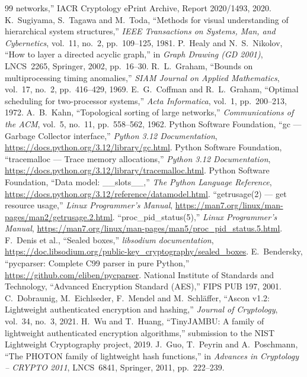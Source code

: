 \documentclass[12pt,a4paper,oneside]{report}
\begin{document}
\begin{thebibliography}{99}
  networks,'' IACR Cryptology ePrint Archive, Report 2020/1493, 2020.
 K.~Sugiyama, S.~Tagawa and M.~Toda, ``Methods for visual understanding of
  hierarchical system structures,'' \emph{IEEE Transactions on Systems, Man, and Cybernetics},
  vol.~11, no.~2, pp.~109--125, 1981.
 P.~Healy and N.~S.~Nikolov, ``How to layer a directed acyclic graph,'' in
  \emph{Graph Drawing (GD 2001)}, LNCS~2265, Springer, 2002, pp.~16--30.
 R.~L.~Graham, ``Bounds on multiprocessing timing anomalies,'' \emph{SIAM
  Journal on Applied Mathematics}, vol.~17, no.~2, pp.~416--429, 1969.
 E.~G.~Coffman and R.~L.~Graham, ``Optimal scheduling for two-processor
  systems,'' \emph{Acta Informatica}, vol.~1, pp.~200--213, 1972.
 A.~B.~Kahn, ``Topological sorting of large networks,'' \emph{Communications of the
  ACM}, vol.~5, no.~11, pp.~558--562, 1962.
 Python Software Foundation, ``gc --- Garbage Collector interface,'' \emph{Python
  3.12 Documentation}, \url{https://docs.python.org/3.12/library/gc.html}.
 Python Software Foundation, ``tracemalloc --- Trace memory allocations,''
  \emph{Python 3.12 Documentation}, \url{https://docs.python.org/3.12/library/tracemalloc.html}.
 Python Software Foundation, ``Data model: \_\_slots\_\_,'' \emph{The Python
  Language Reference}, \url{https://docs.python.org/3.12/reference/datamodel.html}.
 ``getrusage(2) --- get resource usage,'' \emph{Linux Programmer's Manual},
  \url{https://man7.org/linux/man-pages/man2/getrusage.2.html}.
 ``proc\_pid\_status(5),'' \emph{Linux Programmer's Manual},
  \url{https://man7.org/linux/man-pages/man5/proc_pid_status.5.html}.
 F.~Denis et al., ``Sealed boxes,'' \emph{libsodium documentation},
  \url{https://doc.libsodium.org/public-key_cryptography/sealed_boxes}.
 E.~Bendersky, ``pycparser: Complete C99 parser in pure Python,''
  \url{https://github.com/eliben/pycparser}.
 National Institute of Standards and Technology, ``Advanced Encryption Standard
  (AES),'' FIPS PUB 197, 2001.
 C.~Dobraunig, M.~Eichlseder, F.~Mendel and M.~Schl\"affer, ``Ascon v1.2:
  Lightweight authenticated encryption and hashing,'' \emph{Journal of Cryptology}, vol.~34,
  no.~3, 2021.
 H.~Wu and T.~Huang, ``TinyJAMBU: A family of lightweight authenticated
  encryption algorithms,'' submission to the NIST Lightweight Cryptography project, 2019.
 J.~Guo, T.~Peyrin and A.~Poschmann, ``The PHOTON family of lightweight hash
  functions,'' in \emph{Advances in Cryptology -- CRYPTO 2011}, LNCS~6841, Springer, 2011,
  pp.~222--239.
\end{thebibliography}
\endgroup

\end{document}
